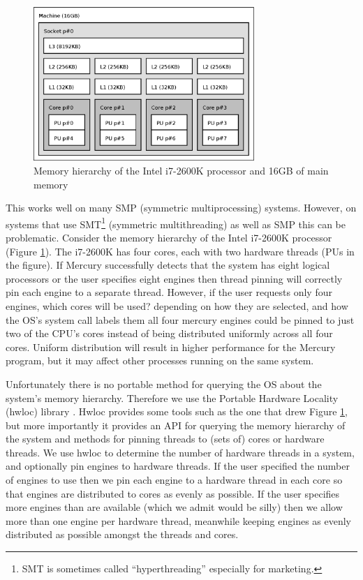 \begin{figure}
\begin{center}
\includegraphics[width=0.75\textwidth]{i7-hierarchy}
\end{center}
\caption{Memory hierarchy of the Intel i7-2600K processor and 16GB of main
memory}
\label{fig:i7_hierarchy}
\end{figure}

This works well on many SMP (symmetric multiprocessing) systems.
However, on systems that use SMT\footnote{
    SMT is sometimes called ``hyperthreading'' especially for marketing.}
(symmetric multithreading) as well as SMP this can be problematic.
Consider the memory hierarchy of the Intel i7-2600K processor
(Figure \ref{fig:i7_hierarchy}).
The i7-2600K has four cores, each with two hardware threads (PUs in the
figure).
If Mercury successfully detects that the system has eight logical processors
or the user specifies eight engines then thread pinning will correctly pin
each engine to a separate thread.
However,
if the user requests only four engines, which cores will be used?
depending on how they are selected,
and how the OS's  system call labels them all four
mercury engines could be pinned to just two of the CPU's cores instead of
being distributed uniformly across all four cores.
Uniform distribution will result in higher performance for the Mercury
program,
but it may affect other processes running on the same system.

Unfortunately there is no portable method for querying the OS about the
system's memory hierarchy.
Therefore we use the Portable Hardware Locality (hwloc) library
\citep{broquedis:2010:hwloc}.
Hwloc provides some tools such as the one that drew Figure
\ref{fig:i7_hierarchy},
but more importantly it provides an API for querying the memory hierarchy of
the system and methods for pinning threads to (sets of) cores or hardware
threads.
We use hwloc to determine the number of hardware threads in a system,
and optionally pin engines to hardware threads.
If the user specified the number of engines to use then we pin each engine
to a hardware thread in each core so that engines are distributed to cores
as evenly as possible.
If the user specifies more engines than are available
(which we admit would be silly) then we allow more than one engine per
hardware thread,
meanwhile keeping engines as evenly distributed as possible amongst the
threads and cores.

